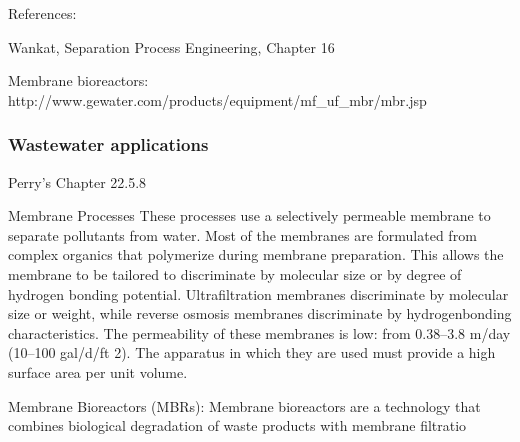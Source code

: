 
References:

Wankat, Separation Process Engineering, Chapter 16

Membrane bioreactors: http://www.gewater.com/products/equipment/mf_uf_mbr/mbr.jsp


\begin{frame}\frametitle{Wastewater applications}
	Perry's Chapter 22.5.8
	
	Membrane Processes These processes use a selectively permeable membrane to separate pollutants from water. Most of the membranes are formulated from complex organics that polymerize during membrane preparation. This allows the membrane to be tailored to discriminate by molecular size or by degree of hydrogen bonding potential. Ultrafiltration membranes discriminate by molecular size or weight, while reverse osmosis membranes discriminate by hydrogenbonding characteristics. The permeability of these membranes is low: from 0.38–3.8 m/day (10–100 gal/d/ft 2). The apparatus in which they are used must provide a high surface area per unit volume.

	Membrane Bioreactors (MBRs): Membrane bioreactors are a technology that combines biological degradation of waste products with membrane filtratio
\end{frame}